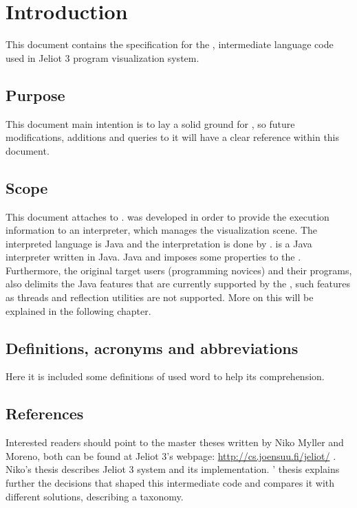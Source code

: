 \chapter{Introduction}
\label{ch:Introduction}

This document contains the specification for the \mcode{}, intermediate language code used in Jeliot 3 program visualization system.

\section{Purpose}
\label{sec:purpose}

This document main intention is to lay a solid ground for \mcode{}, so future modifications, additions and queries to it will have a clear reference within this document.

\section{Scope}
\label{sec:scope}

This document attaches to \jel{}. \mcode{} was developed in order to provide the execution information to an interpreter, which manages the visualization scene. The interpreted language is Java and the interpretation is done by \djava{}. \djava{} is a Java interpreter written in Java. Java and \djava{} imposes some properties to the \mcode{}. Furthermore, the original target users (programming novices) and their programs, also delimits the Java features that are currently supported by the \mcode{}, such features as threads and reflection utilities are not supported. More on this will be explained in the following chapter.

\section{Definitions, acronyms and abbreviations}
\label{sec:definitions}

Here it is included some definitions of used word to help its comprehension.

\section{References}
\label{sec:deferences}

Interested readers should point to the master theses written by Niko Myller and \andres{} Moreno, both can be found at Jeliot 3's webpage: \url{http://cs.joensuu.fi/jeliot/} . Niko's thesis \citep{myllerthesis} describes Jeliot 3 system and its implementation. \andres{}' thesis \citep{morenothesis} explains further the decisions that shaped this intermediate code and compares it with different solutions, describing a taxonomy.

